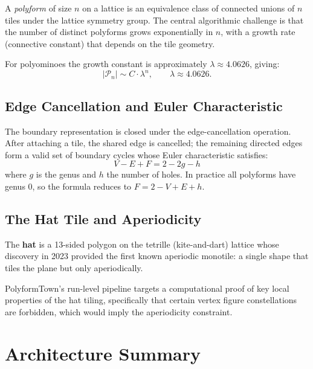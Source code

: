 \documentclass[10pt,a4paper]{article}
\begin{document}
A \emph{polyform} of size $n$ on a lattice is an equivalence class of
connected unions of $n$ tiles under the lattice symmetry group.  The
central algorithmic challenge is that the number of distinct polyforms
grows exponentially in $n$, with a growth rate (connective constant)
that depends on the tile geometry.

For polyominoes the growth constant is approximately $\lambda \approx
4.0626$, giving:
\[
  |\mathcal{P}_n| \sim C \cdot \lambda^n, \qquad \lambda \approx 4.0626.
\]

\subsection{Edge Cancellation and Euler Characteristic}

The boundary representation is closed under the edge-cancellation
operation.  After attaching a tile, the shared edge is cancelled; the
remaining directed edges form a valid set of boundary cycles whose
Euler characteristic satisfies:
\[
  V - E + F = 2 - 2g - h
\]
where $g$ is the genus and $h$ the number of holes.  In practice all
polyforms have genus 0, so the formula reduces to $F = 2 - V + E + h$.

\subsection{The Hat Tile and Aperiodicity}

The \textbf{hat} is a 13-sided polygon on the tetrille (kite-and-dart)
lattice whose discovery in 2023 provided the first known aperiodic
monotile: a single shape that tiles the plane but only aperiodically.

PolyformTown's run-level pipeline targets a computational proof of
key local properties of the hat tiling, specifically that certain
vertex figure constellations are forbidden, which would imply the
aperiodicity constraint.

\section{Architecture Summary}
\end{document}
